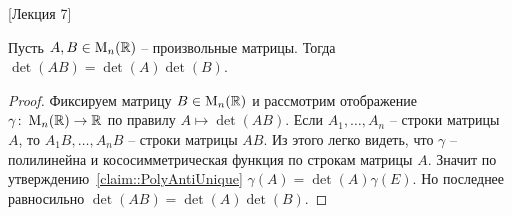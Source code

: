 [Лекция 7]


\begin{claim}
\label{claim::DetMulti}
Пусть $A,B\in\operatorname{M}_{n}(\mathbb R)$ -- произвольные матрицы.
Тогда $\det(AB) = \det(A)\det(B)$.
\end{claim}
\begin{proof}
Фиксируем матрицу $B\in\operatorname{M}_{n}(\mathbb R)$ и рассмотрим отображение $\gamma\colon \operatorname{M}_{n}(\mathbb R)\to \mathbb R$ по правилу $A\mapsto \det(AB)$.
Если $A_1,\ldots, A_n$ -- строки матрицы $A$, то $A_1B, \ldots, A_nB$ -- строки матрицы $AB$.
Из этого легко видеть, что $\gamma$ -- полилинейна и кососимметрическая функция по строкам матрицы $A$.
Значит по утверждению~\ref{claim::PolyAntiUnique} $\gamma(A) = \det(A)\gamma(E)$.
Но последнее равносильно $\det(AB) = \det(A)\det (B)$.
\end{proof}

